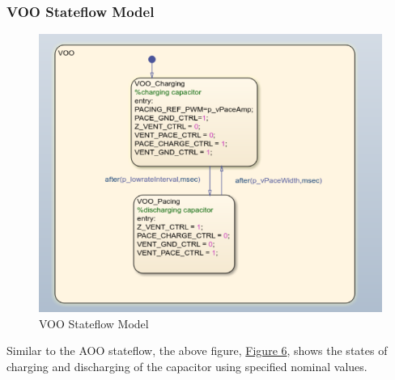 \documentclass{article}
\begin{document}
\subsubsection{VOO Stateflow Model}
\begin{tcolorbox}
    \begin{figure}[H]
        \includegraphics[width=\textwidth]{VOO.png}
        \caption{VOO Stateflow Model}
        \label{VOOSF}
    \end{figure}
\end{tcolorbox}
Similar to the AOO stateflow, the above figure, \hyperref[VOOSF]{Figure 6}, shows the states of 
charging and discharging of the capacitor using specified nominal values. 

\newpage
\end{document}
